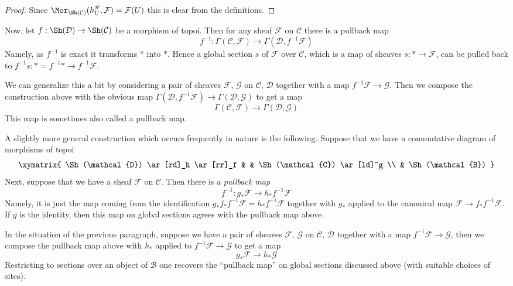 \begin{proof}
Since $\Mor_{\Sh(\mathcal{C})}(h_U^\#, \mathcal{F}) = \mathcal{F}(U)$
this is clear from the definitions.
\end{proof}

\noindent
Now, let $f : \Sh(\mathcal{D}) \to \Sh(\mathcal{C})$ be a morphism of topoi.
Then for any sheaf $\mathcal{F}$ on $\mathcal{C}$ there is a pullback map
$$
f^{-1} :
\Gamma(\mathcal{C}, \mathcal{F})
\longrightarrow
\Gamma(\mathcal{D}, f^{-1}\mathcal{F})
$$
Namely, as $f^{-1}$ is exact it transforms $*$ into $*$. Hence a global
section $s$ of $\mathcal{F}$ over $\mathcal{C}$, which is a map
of sheaves $s : * \to \mathcal{F}$, can be pulled back to
$f^{-1}s : * = f^{-1}* \to f^{-1}\mathcal{F}$.

\medskip\noindent
We can generalize this a bit by considering a pair of sheaves
$\mathcal{F}$, $\mathcal{G}$ on $\mathcal{C}$, $\mathcal{D}$
together with a map $f^{-1}\mathcal{F} \to \mathcal{G}$. Then we
compose the construction above with the obvious map
$\Gamma(\mathcal{D}, f^{-1}\mathcal{F}) \to \Gamma(\mathcal{D}, \mathcal{G})$
to get a map
$$
\Gamma(\mathcal{C}, \mathcal{F})
\longrightarrow
\Gamma(\mathcal{D}, \mathcal{G})
$$
This map is sometimes also called a pullback map.

\medskip\noindent
A slightly more general construction which occurs frequently in nature
is the following. Suppose that we have a commutative diagram of
morphisms of topoi
$$
\xymatrix{
\Sh(\mathcal{D}) \ar[rd]_h \ar[rr]_f & &
\Sh(\mathcal{C}) \ar[ld]^g \\
& \Sh(\mathcal{B})
}
$$
Next, suppose that we have a sheaf $\mathcal{F}$ on $\mathcal{C}$.
Then there is a {\it pullback map}
$$
f^{-1} : g_*\mathcal{F} \longrightarrow h_*f^{-1}\mathcal{F}
$$
Namely, it is just the map coming from the identification
$g_*f_*f^{-1}\mathcal{F} = h_*f^{-1}\mathcal{F}$ together with
$g_*$ applied to the canonical map $\mathcal{F} \to f_*f^{-1}\mathcal{F}$.
If $g$ is the identity, then this map on global sections agrees 
with the pullback map above.

\medskip\noindent
In the situation of the previous paragraph, suppose
we have a pair of sheaves $\mathcal{F}$, $\mathcal{G}$
on $\mathcal{C}$, $\mathcal{D}$ together with a map
$f^{-1}\mathcal{F} \to \mathcal{G}$, then we compose
the pullback map above with $h_*$ applied to
$f^{-1}\mathcal{F} \to \mathcal{G}$
to get a map
$$
g_*\mathcal{F} \longrightarrow h_*\mathcal{G}
$$
Restricting to sections over an object of $\mathcal{B}$ one recovers
the ``pullback map'' on global sections discussed above (with suitable
choices of sites).

